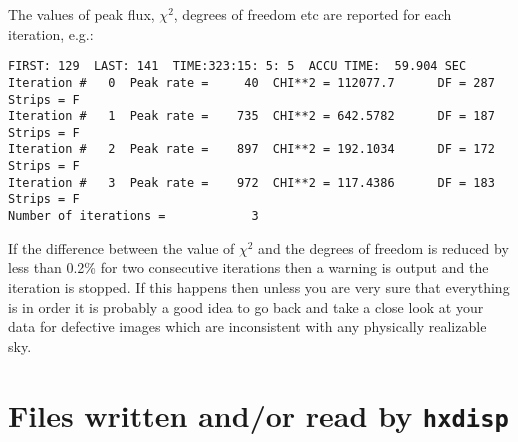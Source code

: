 The values of peak flux, $\chi^2$, degrees of freedom etc are reported
for each iteration, e.g.:
\begin{verbatim}
FIRST: 129  LAST: 141  TIME:323:15: 5: 5  ACCU TIME:  59.904 SEC
Iteration #   0  Peak rate =     40  CHI**2 = 112077.7      DF = 287  Strips = F
Iteration #   1  Peak rate =    735  CHI**2 = 642.5782      DF = 187  Strips = F
Iteration #   2  Peak rate =    897  CHI**2 = 192.1034      DF = 172  Strips = F
Iteration #   3  Peak rate =    972  CHI**2 = 117.4386      DF = 183  Strips = F
Number of iterations =            3
\end{verbatim}

If the difference between the value of $\chi^2$ and the degrees of freedom is
reduced by less than 0.2\% for two consecutive iterations then a warning is
output and the iteration is stopped.
If this happens then unless you are very sure that everything is in order it is
probably a good idea to go back and take a close look at your data for
defective images which are inconsistent with any physically realizable sky.


\section{Files written and/or read by {\tt hxdisp}}
\label{FILES}


